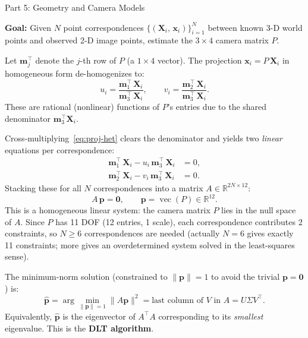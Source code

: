 \documentclass[letterpaper]{article}
\begin{document}
\begin{notes}{Part 5: Geometry and Camera Models}

\textbf{Goal:} Given $N$ point correspondences
$\bigl\{(\mathbf{X}_i,\,\mathbf{x}_i)\bigr\}_{i=1}^{N}$ between known
3-D world points and observed 2-D image points, estimate the $3\times 4$
camera matrix $P$.


Let $\mathbf{m}_j^\top$ denote the $j$-th row of $P$ (a $1\times 4$
vector).  The projection $\mathbf{x}_i = P\,\mathbf{X}_i$ in homogeneous
form de-homogenizes to:
\begin{equation}
  u_i = \frac{\mathbf{m}_1^\top\,\mathbf{X}_i}{\mathbf{m}_3^\top\,\mathbf{X}_i},
  \qquad
  v_i = \frac{\mathbf{m}_2^\top\,\mathbf{X}_i}{\mathbf{m}_3^\top\,\mathbf{X}_i}.
  \label{eq:proj-het}
\end{equation}
These are rational (nonlinear) functions of $P$'s entries due to the
shared denominator $\mathbf{m}_3^\top\mathbf{X}_i$.


Cross-multiplying~\eqref{eq:proj-het} clears the denominator and yields
two \emph{linear} equations per correspondence:
\begin{align}
  \mathbf{m}_1^\top\,\mathbf{X}_i - u_i\,\mathbf{m}_3^\top\,\mathbf{X}_i &= 0, \\
  \mathbf{m}_2^\top\,\mathbf{X}_i - v_i\,\mathbf{m}_3^\top\,\mathbf{X}_i &= 0.
\end{align}
Stacking these for all $N$ correspondences into a matrix $A \in \mathbb{R}^{2N\times 12}$:
\begin{equation}
  A\,\mathbf{p} = \mathbf{0}, \qquad \mathbf{p} = \operatorname{vec}(P) \in \mathbb{R}^{12}.
\end{equation}
This is a homogeneous linear system: the camera matrix $P$ lies in the
null space of $A$.  Since $P$ has 11 DOF (12 entries, 1 scale), each
correspondence contributes 2 constraints, so $N \geq 6$ correspondences
are needed (actually $N=6$ gives exactly 11 constraints; more gives an
overdetermined system solved in the least-squares sense).


The minimum-norm solution (constrained to $\|\mathbf{p}\|=1$ to avoid
the trivial $\mathbf{p}=\mathbf{0}$) is:
\begin{equation}
  \hat{\mathbf{p}} = \arg\min_{\|\mathbf{p}\|=1} \|A\mathbf{p}\|^2
  = \text{last column of } V \text{ in } A = U\Sigma V^\top.
\end{equation}
Equivalently, $\hat{\mathbf{p}}$ is the eigenvector of $A^\top A$
corresponding to its \emph{smallest} eigenvalue.  This is the
\textbf{DLT algorithm}.


\end{notes}
\end{document}
